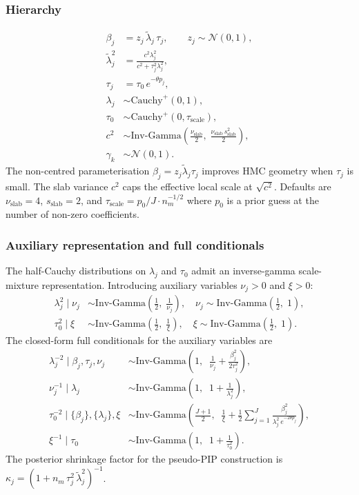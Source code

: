\documentclass[12pt]{article}
\begin{document}
\subsubsection{Hierarchy}
\begin{align}
\beta_j &= z_j\, \tilde{\lambda}_j\, \tau_j, \qquad z_j \sim \mathcal{N}(0, 1),\\
\tilde{\lambda}^2_j &= \frac{c^2 \lambda^2_j}{c^2 + \tau^2_j \lambda^2_j},\\
\tau_j &= \tau_0\, e^{-\theta p_j},\\
\lambda_j &\sim \mathrm{Cauchy}^+(0, 1),\\
\tau_0 &\sim \mathrm{Cauchy}^+(0, \tau_{\mathrm{scale}}),\\
c^2 &\sim \mathrm{Inv\text{-}Gamma}\!\left(\frac{\nu_{\mathrm{slab}}}{2},\; \frac{\nu_{\mathrm{slab}}\, s^2_{\mathrm{slab}}}{2}\right),\\
\gamma_k &\sim \mathcal{N}(0, 1).
\end{align}
The non-centred parameterisation $\beta_j = z_j \tilde{\lambda}_j \tau_j$
improves HMC geometry when $\tau_j$ is small. The slab variance $c^2$ caps the
effective local scale at $\sqrt{c^2}$. Defaults are $\nu_{\mathrm{slab}} = 4$,
$s_{\mathrm{slab}} = 2$, and $\tau_{\mathrm{scale}} = p_0 / J \cdot n_m^{-1/2}$
where $p_0$ is a prior guess at the number of non-zero coefficients.

\subsubsection{Auxiliary representation and full conditionals}
The half-Cauchy distributions on $\lambda_j$ and $\tau_0$ admit an inverse-gamma
scale-mixture representation. Introducing auxiliary variables $\nu_j > 0$ and
$\xi > 0$:
\begin{align}
\lambda^2_j \mid \nu_j &\sim \mathrm{Inv\text{-}Gamma}\!\left(\tfrac{1}{2},\; \tfrac{1}{\nu_j}\right), \quad \nu_j \sim \mathrm{Inv\text{-}Gamma}\!\left(\tfrac{1}{2},\; 1\right),\\
\tau^2_0 \mid \xi &\sim \mathrm{Inv\text{-}Gamma}\!\left(\tfrac{1}{2},\; \tfrac{1}{\xi}\right), \quad \xi \sim \mathrm{Inv\text{-}Gamma}\!\left(\tfrac{1}{2},\; 1\right).
\end{align}
The closed-form full conditionals for the auxiliary variables are
\begin{align}
\lambda^{-2}_j \mid \beta_j, \tau_j, \nu_j &\sim \mathrm{Inv\text{-}Gamma}\!\left(1,\;\; \frac{1}{\nu_j} + \frac{\beta_j^2}{2\tau^2_j}\right),\\
\nu^{-1}_j \mid \lambda_j &\sim \mathrm{Inv\text{-}Gamma}\!\left(1,\;\; 1 + \frac{1}{\lambda^2_j}\right),\\
\tau^{-2}_0 \mid \{\beta_j\}, \{\lambda_j\}, \xi &\sim \mathrm{Inv\text{-}Gamma}\!\left(\frac{J+1}{2},\;\; \frac{1}{\xi} + \frac{1}{2}\sum_{j=1}^J \frac{\beta_j^2}{\lambda^2_j\, e^{-2\theta p_j}}\right),\\
\xi^{-1} \mid \tau_0 &\sim \mathrm{Inv\text{-}Gamma}\!\left(1,\;\; 1 + \frac{1}{\tau^2_0}\right).
\end{align}
The posterior shrinkage factor for the pseudo-PIP construction is
$\kappa_j = (1 + n_m\, \tau^2_j\, \tilde{\lambda}^2_j)^{-1}$.
\end{document}
